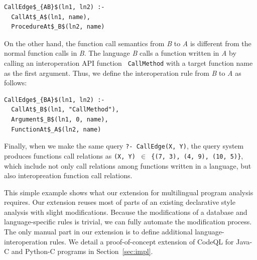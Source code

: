 \begin{lstlisting}
CallEdge$_{AB}$(ln1, ln2) :-
  CallAt$_A$(ln1, name),
  ProcedureAt$_B$(ln2, name)
\end{lstlisting}

\noindent
On the other hand, the function call semantics from {\it B} to {\it A} is
different from the normal function calls in {\it B}. The language {\it B} calls
a function written in {\it A} by calling an interoperation API function {\tt
CallMethod} with a target function name as the first argument. Thus, we define
the interoperation rule from {\it B} to {\it A} as follows: 


\begin{lstlisting}
CallEdge$_{BA}$(ln1, ln2) :-
  CallAt$_B$(ln1, "CallMethod"),
  Argument$_B$(ln1, 0, name),
  FunctionAt$_A$(ln2, name)
\end{lstlisting}

%

Finally, when we make the same query {\tt ?- CallEdge(X, Y)}, the query system
produces functions call relations as {\tt (X, Y) $\in$ \{(7, 3), (4, 9), (10,
5)\}}, which include not only call relations among functions written in a
language, but also interopreation function call relations. 

This simple example shows what our extension for multilingual program analysis
requires. Our extension reuses most of parts of an existing declarative style
analysis with slight modifications. Because the modifications of a database and
language-specific rules is trivial, we can fully automate the modification
process.  The only manual part in our extension is to define additional
language-interoperation rules. We detail a proof-of-concept extension of CodeQL
for Java-C and Python-C programs in Section~\ref{sec:impl}.


